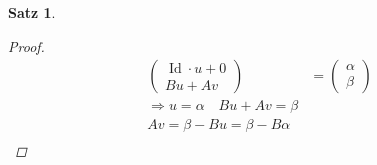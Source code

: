 \documentclass[11pt, twoside, a4paper]{article}
\theoremstyle{plain}
\newtheorem{satz}[blockelement]{Satz}
\numberwithin{equation}{subsection}
\newcommand{\impl}[0]{\Rightarrow{}}
\DeclareMathOperator{\Id}{Id}
\begin{document}
\begin{satz}
\begin{proof}
\begin{align*}
\begin{pmatrix}
                          \Id\cdot u + 0\\ Bu + Av
                \end{pmatrix} &= \begin{pmatrix}
                                    \alpha\\\beta
                \end{pmatrix}\\
                \impl u=\alpha\quad Bu + Av = \beta\\
                Av = \beta - Bu = \beta - B\alpha\\
            \end{align*}
        \end{proof}
    \end{satz}
\end{document}
